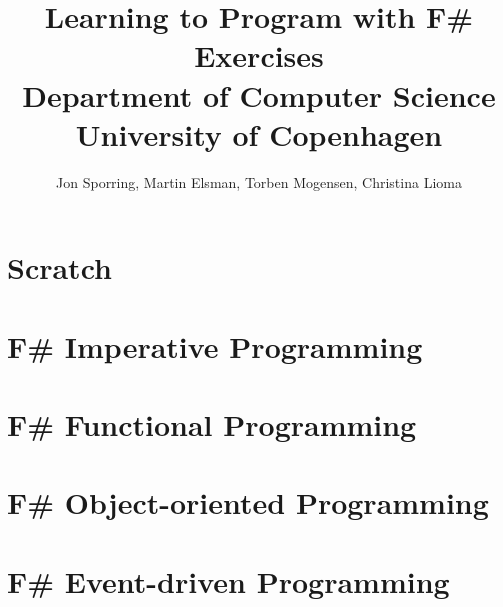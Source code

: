 \documentclass[a4paper,12pt]{report}
\title{Learning to Program with F\#\\Exercises\\Department of Computer
  Science\\University of Copenhagen}
\author{Jon Sporring, Martin Elsman, Torben Mogensen, Christina Lioma}
\begin{document}
\maketitle
\tableofcontents
\newpage
\chapter{Scratch}


\chapter{F\# Imperative Programming}






\chapter{F\# Functional Programming}












\chapter{F\# Object-oriented Programming}









\chapter{F\# Event-driven Programming}




\end{document}
